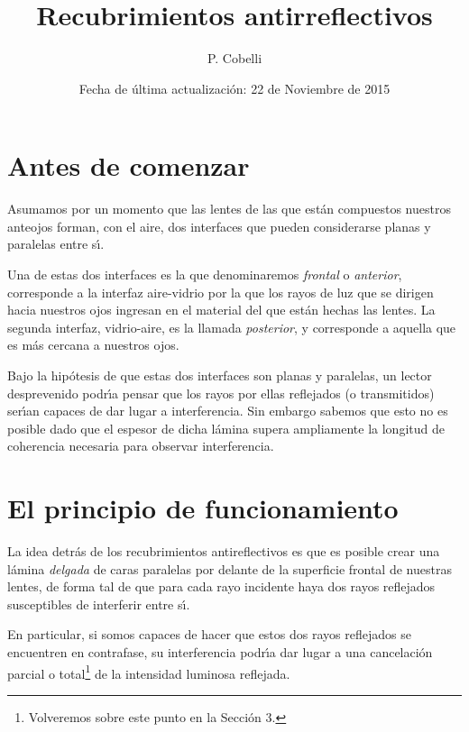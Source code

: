 \documentclass[a4paper]{article}
\begin{document}
\title{Recubrimientos antirreflectivos}
\author{P. Cobelli}
\date{Fecha de \'ultima actualizaci\'on: 22 de Noviembre de 2015}
\maketitle

\noindent\makebox[\linewidth]{\rule{\textwidth}{0.4pt}}
\tableofcontents
\vspace{0.4cm}
\noindent\makebox[\linewidth]{\rule{\textwidth}{0.4pt}}

\section{Antes de comenzar}

Asumamos por un momento que las lentes de las que est\'an compuestos nuestros
anteojos forman, con el aire, dos interfaces que pueden considerarse planas y
paralelas entre s\'\i .

Una de estas dos interfaces es la que denominaremos {\it frontal} o {\it 
anterior}, 
corresponde a la interfaz aire-vidrio por la que los rayos de luz que se 
dirigen hacia nuestros ojos ingresan en el material del que est\'an hechas 
las lentes. La segunda interfaz, vidrio-aire,  es la llamada {\it posterior}, 
y corresponde a aquella que es m\'as cercana a nuestros ojos. 

Bajo la hip\'otesis de que estas dos interfaces son planas y paralelas, 
un lector desprevenido podr\'\i a pensar que los rayos por ellas reflejados (o 
transmitidos) ser\'\i an capaces de dar lugar a interferencia. Sin embargo 
sabemos que esto no es posible dado que el espesor de dicha l\'amina supera
ampliamente la longitud de coherencia necesaria para observar interferencia.

\section{El principio de funcionamiento}

La idea detr\'as de los recubrimientos antireflectivos es que es posible crear
una l\'amina {\it delgada} de caras paralelas por delante de la superficie
frontal de nuestras lentes, de forma tal de que para cada rayo incidente 
haya dos rayos reflejados susceptibles de interferir entre s\'\i . 

En particular, si somos capaces de hacer que estos dos rayos reflejados 
se encuentren en contrafase, su interferencia podr\'\i a dar lugar a una
cancelaci\'on parcial o total\footnote{Volveremos sobre este punto en la
Secci\'on 3.} de la intensidad luminosa reflejada. 
\end{document}
